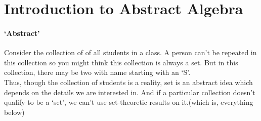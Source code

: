 




\section{Introduction to Abstract Algebra}
\begin{story}
\paragraph{`Abstract'}
Consider the collection of of all students in a class. A person can't be repeated in this collection so you might think this collection is always a set. But in this collection, there may be two with name starting with an `S'.\\

Thus, though the collection of students is a reality, set is an abstract idea which depends on the details we are interested in. And if a particular collection doesn't qualify to be a `set', we can't use set-theoretic results on it.(which is, everything below)
\end{story}

